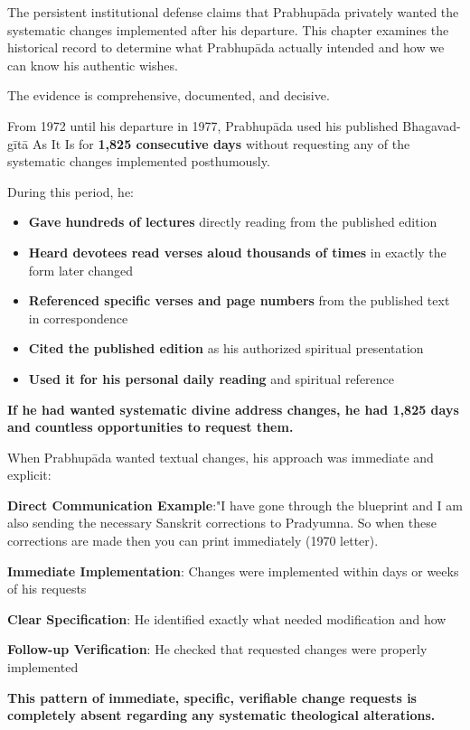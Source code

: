 \documentclass[12pt,twoside]{book}
\begin{document}
The persistent institutional defense claims that Prabhupāda privately wanted the systematic changes implemented after his departure. This chapter examines the historical record to determine what Prabhupāda actually intended and how we can know his authentic wishes.

The evidence is comprehensive, documented, and decisive.


From 1972 until his departure in 1977, Prabhupāda used his published Bhagavad-gītā As It Is for \textbf{\textbf{1,825 consecutive days}} without requesting any of the systematic changes implemented posthumously.

During this period, he:
\begin{itemize}
\item \textbf{\textbf{Gave hundreds of lectures}} directly reading from the published edition
\item \textbf{\textbf{Heard devotees read verses aloud thousands of times}} in exactly the form later changed
\item \textbf{\textbf{Referenced specific verses and page numbers}} from the published text in correspondence
\item \textbf{\textbf{Cited the published edition}} as his authorized spiritual presentation
\item \textbf{\textbf{Used it for his personal daily reading}} and spiritual reference
\end{itemize}

\textbf{\textbf{If he had wanted systematic divine address changes, he had 1,825 days and countless opportunities to request them.}}

When Prabhupāda wanted textual changes, his approach was immediate and explicit:

\textbf{\textbf{Direct Communication Example}}:"I have gone through the blueprint and I am also sending the necessary Sanskrit corrections to Pradyumna. So when these corrections are made then you can print immediately (1970 letter).

\textbf{\textbf{Immediate Implementation}}: Changes were implemented within days or weeks of his requests

\textbf{\textbf{Clear Specification}}: He identified exactly what needed modification and how

\textbf{\textbf{Follow-up Verification}}: He checked that requested changes were properly implemented

\textbf{\textbf{This pattern of immediate, specific, verifiable change requests is completely absent regarding any systematic theological alterations.}}
\end{document}
